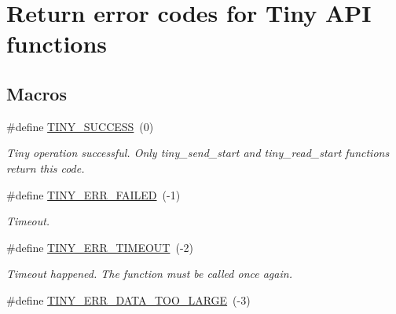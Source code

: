 \hypertarget{group__ERROR__FLAGS}{}\section{Return error codes for Tiny A\+PI functions}
\label{group__ERROR__FLAGS}
\subsection*{Macros}
\begin{DoxyCompactItemize}
\item 
\mbox{\label{group__ERROR__FLAGS_ga16cd043c890ed1fa381b3a20f75a626c}} 
\#define \hyperlink{group__ERROR__FLAGS_ga16cd043c890ed1fa381b3a20f75a626c}{T\+I\+N\+Y\+\_\+\+S\+U\+C\+C\+E\+SS}~(0)
\begin{DoxyCompactList}\small\item\em Tiny operation successful. Only tiny\+\_\+send\+\_\+start and tiny\+\_\+read\+\_\+start functions return this code. \end{DoxyCompactList}\item 
\mbox{\label{group__ERROR__FLAGS_ga84e6ca143550038e1a71cf36078d1926}} 
\#define \hyperlink{group__ERROR__FLAGS_ga84e6ca143550038e1a71cf36078d1926}{T\+I\+N\+Y\+\_\+\+E\+R\+R\+\_\+\+F\+A\+I\+L\+ED}~(-\/1)
\begin{DoxyCompactList}\small\item\em Timeout. \end{DoxyCompactList}\item 
\mbox{\label{group__ERROR__FLAGS_gac9ba8076a1eb8613e8d1f07629ff0cd1}} 
\#define \hyperlink{group__ERROR__FLAGS_gac9ba8076a1eb8613e8d1f07629ff0cd1}{T\+I\+N\+Y\+\_\+\+E\+R\+R\+\_\+\+T\+I\+M\+E\+O\+UT}~(-\/2)
\begin{DoxyCompactList}\small\item\em Timeout happened. The function must be called once again. \end{DoxyCompactList}\item 
\mbox{\label{group__ERROR__FLAGS_ga7bbe7440d11ad304b0af68e011f4eab7}} 
\#define \hyperlink{group__ERROR__FLAGS_ga7bbe7440d11ad304b0af68e011f4eab7}{T\+I\+N\+Y\+\_\+\+E\+R\+R\+\_\+\+D\+A\+T\+A\+\_\+\+T\+O\+O\+\_\+\+L\+A\+R\+GE}~(-\/3)

\end{DoxyCompactItemize}
